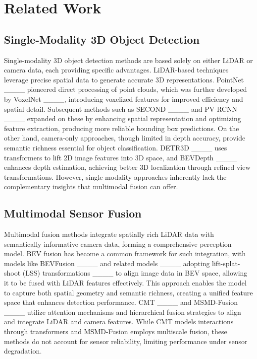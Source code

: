 \section{Related Work}
\label{sec:Related}

\subsection {Single-Modality 3D Object Detection}
Single-modality 3D object detection methods are based solely on either LiDAR or camera data, each providing specific advantages. LiDAR-based techniques leverage precise spatial data to generate accurate 3D representations. PointNet ____ pioneered direct processing of point clouds, which was further developed by VoxelNet ____, introducing voxelized features for improved efficiency and spatial detail. Subsequent methods such as SECOND ____ and PV-RCNN ____ expanded on these by enhancing spatial representation and optimizing feature extraction, producing more reliable bounding box predictions. On the other hand, camera-only approaches, though limited in depth accuracy, provide semantic richness essential for object classification. DETR3D ____ uses transformers to lift 2D image features into 3D space, and BEVDepth ____ enhances depth estimation, achieving better 3D localization through refined view transformations. However, single-modality approaches inherently lack the complementary insights that multimodal fusion can offer.

\subsection{ Multimodal Sensor Fusion}
Multimodal fusion methods integrate spatially rich LiDAR data with semantically informative camera data, forming a comprehensive perception model. BEV fusion has become a common framework for such integration, with models like BEVFusion ____ and related models ____ adopting lift-splat-shoot (LSS) transformations ____ to align image data in BEV space, allowing it to be fused with LiDAR features effectively. This approach enables the model to capture both spatial geometry and semantic richness, creating a unified feature space that enhances detection performance. CMT ____ and MSMD-Fusion ____ utilize attention mechanisms and hierarchical fusion strategies to align and integrate LiDAR and camera features. While CMT models interactions through transformers and MSMD-Fusion employs multiscale fusion, these methods do not account for sensor reliability, limiting performance under sensor degradation.



